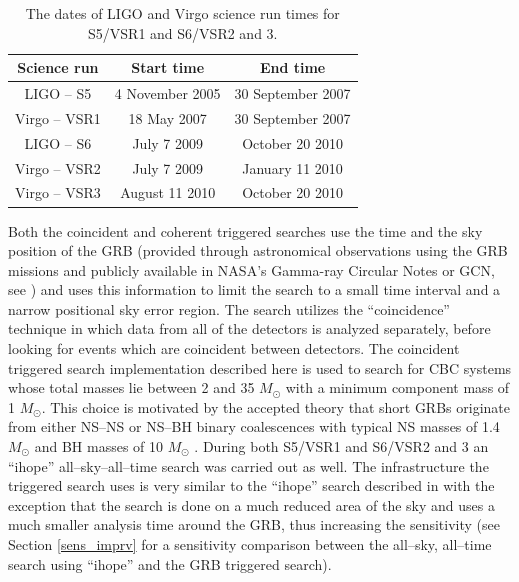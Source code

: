 \begin{table}[tp!]
\center
\begin{tabular}{c | c | c}
\hline
\hline
Science run & Start time & End time \\
\hline
\hline
LIGO -- S5 & 4 November 2005 & 30 September 2007 \\
\hline
Virgo -- VSR1 & 18 May 2007 & 30 September 2007 \\
\hline
LIGO -- S6 & July 7 2009 & October 20 2010 \\
\hline
Virgo -- VSR2 & July 7 2009 & January 11 2010 \\
\hline
Virgo -- VSR3 & August 11 2010 & October 20 2010 \\
\hline
\hline
\end{tabular}
\caption[Duration of LIGO and Virgo science times.]
{The dates of LIGO and Virgo science run times for S5/VSR1 and S6/VSR2 and 3.}
\label{tab:sciencetimes}
\end{table}

Both the coincident and coherent triggered searches use the time and the sky position of the GRB (provided through astronomical observations using the GRB missions and publicly available in NASA's Gamma-ray Circular Notes or GCN, see \cite{gcns}) and uses this information to limit the search to a small time interval and a narrow positional sky error region. The search utilizes the ``coincidence'' technique in which data from all of the detectors is analyzed separately, before looking for events which are coincident between detectors. The coincident triggered search implementation described here is used to search for \ac{CBC} systems whose total masses lie between 2 and 35 $M_{\odot}$ with a minimum component mass of 1 $M_{\odot}$. This choice is motivated by the accepted theory that short GRBs originate from either NS--NS or NS--BH binary coalescences with typical NS masses of 1.4 $M_{\odot}$ and BH masses of 10 $M_{\odot}$ \cite{Abadie:2010uf}. During both S5/VSR1 and S6/VSR2 and 3 an ``ihope'' all--sky--all--time search was carried out as well. The infrastructure the triggered search uses is very similar to the ``ihope'' search described in \cite{Abbott:2009qj} with the exception that the search is done on a much reduced area of the sky and uses a much smaller analysis time around the GRB, thus increasing the sensitivity (see Section \ref{sens_imprv} for a sensitivity comparison between the all--sky, all--time search using ``ihope'' and the GRB triggered search).

